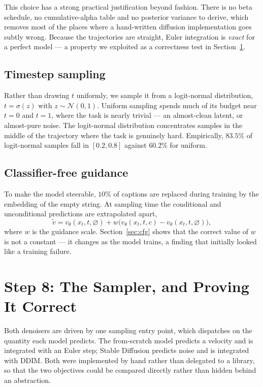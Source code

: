 \documentclass[11pt,a4paper]{article}
\newcommand{\step}[1]{\section{#1}}
\begin{document}
This choice has a strong practical justification beyond fashion. There is no
beta schedule, no cumulative-alpha table and no posterior variance to derive,
which removes most of the places where a hand-written diffusion implementation
goes subtly wrong. Because the trajectories are straight, Euler integration is
\emph{exact} for a perfect model --- a property we exploited as a correctness
test in Section~\ref{sec:sampler}.

\subsection{Timestep sampling}

Rather than drawing $t$ uniformly, we sample it from a logit-normal
distribution, $t = \sigma(z)$ with $z \sim \mathcal{N}(0,1)$. Uniform sampling
spends much of its budget near $t=0$ and $t=1$, where the task is nearly trivial
--- an almost-clean latent, or almost-pure noise. The logit-normal distribution
concentrates samples in the middle of the trajectory where the task is genuinely
hard. Empirically, $83.5\%$ of logit-normal samples fall in $[0.2, 0.8]$ against
$60.2\%$ for uniform.

\subsection{Classifier-free guidance}

To make the model steerable, $10\%$ of captions are replaced during training by
the embedding of the empty string. At sampling time the conditional and
unconditional predictions are extrapolated apart,
\begin{equation}
\tilde{v} = v_\theta(x_t, t, \varnothing) + w \big( v_\theta(x_t, t, c) - v_\theta(x_t, t, \varnothing) \big),
\end{equation}
where $w$ is the guidance scale. Section~\ref{sec:cfg} shows that the correct
value of $w$ is not a constant --- it changes as the model trains, a finding
that initially looked like a training failure.

\step{Step 8: The Sampler, and Proving It Correct}
\label{sec:sampler}

Both denoisers are driven by one sampling entry point, which dispatches on the
quantity each model predicts. The from-scratch model predicts a velocity and is
integrated with an Euler step; Stable Diffusion predicts noise and is integrated
with DDIM. Both were implemented by hand rather than delegated to a library, so
that the two objectives could be compared directly rather than hidden behind an
abstraction.
\end{document}
